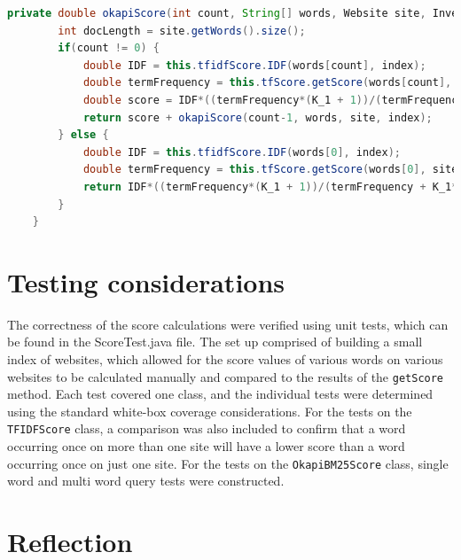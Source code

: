 \begin{lstlisting}[language=Java]
    private double okapiScore(int count, String[] words, Website site, InvertedIndex index) {
        int docLength = site.getWords().size();
        if(count != 0) {
            double IDF = this.tfidfScore.IDF(words[count], index);
            double termFrequency = this.tfScore.getScore(words[count], site, index);
            double score = IDF*((termFrequency*(K_1 + 1))/(termFrequency + K_1*(1 - B + B*(docLength/AVERAGE_DOC_LENGTH))));
            return score + okapiScore(count-1, words, site, index);
        } else {
            double IDF = this.tfidfScore.IDF(words[0], index);
            double termFrequency = this.tfScore.getScore(words[0], site, index);
            return IDF*((termFrequency*(K_1 + 1))/(termFrequency + K_1*(1 - B + B*(docLength/AVERAGE_DOC_LENGTH))));
        }
    }
\end{lstlisting}

\section{Testing considerations}
The correctness of the score calculations were verified using unit tests, which can be found in the ScoreTest.java file.
The set up comprised of building a small index of websites, which allowed for the score values of various words on various
websites to be calculated manually and compared to the results of the {\tt getScore} method.
Each test covered one class, and the individual tests were determined using the standard white-box coverage considerations.
For the tests on the {\tt TFIDFScore} class, a comparison was also included to confirm that a word occurring once on more than one site will have a lower score than a word occurring once on just one site.
For the tests on the {\tt OkapiBM25Score} class, single word and multi word query tests were constructed.

\section{Reflection}
